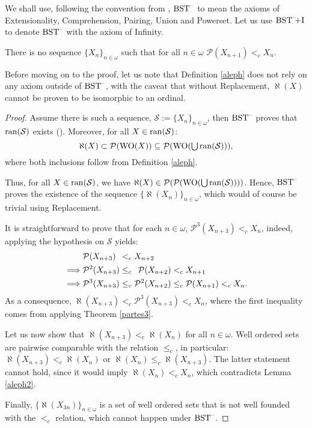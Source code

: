 We shall use, following the convention from \cite[Def. I.3.1]{Kunen}, $\Bst$ to mean the axioms of Extensionality, Comprehension, Pairing, Union and Powerset. 
Let us use $\operatorname{\text{BST}^{--}\hspace{-2 pt}\text{+I}}$ to denote $\Bst$ with the axiom of Infinity.



\begin{theorem}[$\Bst$]
	There is no sequence $\{X_n\}_{n\in\omega}$ such that for all $n\in\omega$ $\mathcal{P}(X_{n+1}) <_c X_n$.
\end{theorem}

Before moving on to the proof, let us note that Definition \ref{aleph} does not rely on any axiom outside of $\Bst$, with the caveat that without Replacement, $\aleph(X)$ cannot be proven to be isomorphic to an ordinal.

\begin{proof}
	Assume there is such a sequence, $\mathcal{S} := \{X_n\}_{n\in\omega}$, then $\Bst$ proves that $\operatorname{ran}(\mathcal{S})$ exists (\cite[Def. I.6.6]{Kunen}).
	Moreover, for all $X\in\operatorname{ran}(\mathcal{S})$: 
	\[
	\aleph(X) \subset \mathcal{P}(\operatorname{WO}(X)) \subseteq \mathcal{P}(\operatorname{WO}(\mathop{\textstyle\bigcup} \operatorname{ran}(\mathcal{S}))),
	\]
	where both inclusions follow from Definition \ref{aleph}.
	
	\noindent Thus, for all $X\in\operatorname{ran}(\mathcal{S})$, we have $\aleph(X)\in\mathcal{P}(\mathcal{P}(\operatorname{WO}(\mathop{\textstyle\bigcup} \operatorname{ran}(\mathcal{S}))))$. Hence, $\Bst$ proves the existence of the sequence $\{\aleph(X_n)\}_{n\in\omega}$, which would of course be trivial using Replacement.
	
	It is straightforward to prove that for each $n\in\omega$, 
	$\mathcal{P}^{3}(X_{n+3}) <_c X_n$, 
	indeed, applying the hypothesis on $\mathcal{S}$ yields:
	\begin{align*}
		&\mathcal{P}(X_{n+3}) \hspace{4.5 pt} <_c X_{n+2}
		\\ \implies &\mathcal{P}^2(X_{n+3}) \leq_c \hspace{4.5 pt} \mathcal{P}(X_{n+2}) <_c X_{n+1}
		\\ \implies &\mathcal{P}^3(X_{n+3}) \leq_c \mathcal{P}^{2}(X_{n+2}) \leq_c \mathcal{P}(X_{n+1}) <_c X_n.
	\end{align*}
	As a consequence,
	$\aleph(X_{n+3}) <_c \mathcal{P}^{3}(X_{n+3}) <_c X_n$, where the first inequality comes from applying Theorem \ref{partes3}.
	
	\noindent Let us now show that $\aleph(X_{n+3}) <_c \aleph(X_n)$ for all $n\in\omega$. Well ordered sets are pairwise comparable with the relation $\leq_c$, in particular: $\aleph(X_{n+3}) <_c \aleph(X_n)$ or $\aleph(X_n) \leq_c \aleph(X_{n+3})$. The latter statement cannot hold, since it would imply $\aleph(X_n) <_c X_n$, which contradicts Lemma \ref{aleph2}.
	
	Finally, $\{\aleph(X_{3n})\}_{n\in\omega}$ is a set of well ordered sets that is not well founded with the $<_c$ relation, which cannot happen under $\Bst$.
\end{proof}

